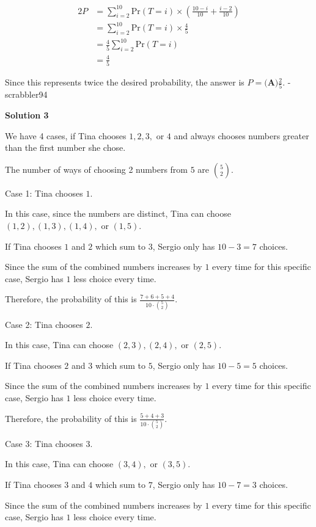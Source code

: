 \begin{enumerate}
 
 \begin{align*} 2P &= \sum_{i=2}^{10} \text{Pr}(T=i) \times \left(\frac{10-i}{10} + \frac{i-2}{10}\right) \\ &= \sum_{i=2}^{10} \text{Pr}(T=i) \times \frac{4}{5} \\ &= \frac{4}{5} \sum_{i=2}^{10} \text{Pr}(T=i) \\ &= \frac{4}{5} \end{align*}


 Since this represents twice the desired probability, the answer is $P = \boxed{\textbf{(A)} \frac{2}{5}}$. -scrabbler94

 



\textbf{Solution 3}

We have 4 cases, if Tina chooses $1, 2, 3,$ or  $4$ and always chooses numbers greater than the first number she chose.

 The number of ways of choosing 2 numbers from $5$ are $\binom{5}{2}$.

 Case 1: Tina chooses $1$.

 In this case, since the numbers are distinct, Tina can choose $(1, 2), (1, 3), (1, 4),$ or $(1, 5).$

 If Tina chooses $1$ and $2$ which sum to $3$, Sergio only has $10-3=7$ choices.

 Since the sum of the combined numbers increases by $1$ every time for this specific case, Sergio has $1$ less choice every time.

 Therefore, the probability of this is $\frac{7+6+5+4}{10 \cdot \binom{5}{2}}$.

 Case 2: Tina chooses $2$.

 In this case, Tina can choose $(2, 3), (2, 4),$ or $(2, 5).$

 If Tina chooses $2$ and $3$ which sum to $5$, Sergio only has $10-5=5$ choices.

 Since the sum of the combined numbers increases by $1$ every time for this specific case, Sergio has $1$ less choice every time.

 Therefore, the probability of this is $\frac{5+4+3}{10 \cdot \binom{5}{2}}$.

 Case 3: Tina chooses $3$.

 In this case, Tina can choose $(3, 4),$ or $(3, 5).$

 If Tina chooses $3$ and $4$ which sum to $7$, Sergio only has $10-7=3$ choices.

 Since the sum of the combined numbers increases by $1$ every time for this specific case, Sergio has $1$ less choice every time.


\end{enumerate}
